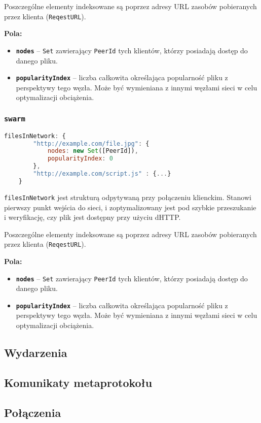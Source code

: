 Poszczególne elementy indeksowane są poprzez adresy URL zasobów pobieranych przez klienta (\texttt{ReqestURL}).

\textbf{Pola:}
\begin{itemize}
    \item \textbf{\texttt{nodes}} -- \texttt{Set} zawierający \texttt{PeerId} tych klientów, którzy posiadają dostęp do danego pliku.
    \item \textbf{\texttt{popularityIndex}} -- liczba całkowita określająca popularność pliku z perspektywy tego węzła. Może być wymieniana z innymi węzłami sieci w celu optymalizacji obciążenia.
\end{itemize}

\subsubsection{\texttt{swarm}}
\begin{lstlisting}[language=javascript]
filesInNetwork: {
        "http://example.com/file.jpg": {
            nodes: new Set([PeerId]),
            popularityIndex: 0
        },
        "http://example.com/script.js" : {...}
    }
\end{lstlisting}
\texttt{filesInNetwork} jest strukturą odpytywaną przy połączeniu klienckim. Stanowi pierwszy punkt wejścia do sieci, i zoptymalizowany jest pod szybkie przeszukanie i weryfikację, czy plik jest dostępny przy użyciu dHTTP.

Poszczególne elementy indeksowane są poprzez adresy URL zasobów pobieranych przez klienta (\texttt{ReqestURL}).

\textbf{Pola:}
\begin{itemize}
    \item \textbf{\texttt{nodes}} -- \texttt{Set} zawierający \texttt{PeerId} tych klientów, którzy posiadają dostęp do danego pliku.
    \item \textbf{\texttt{popularityIndex}} -- liczba całkowita określająca popularność pliku z perspektywy tego węzła. Może być wymieniana z innymi węzłami sieci w celu optymalizacji obciążenia.
\end{itemize}


\subsection{Wydarzenia}
\subsection{Komunikaty metaprotokołu}
\subsection{Połączenia}